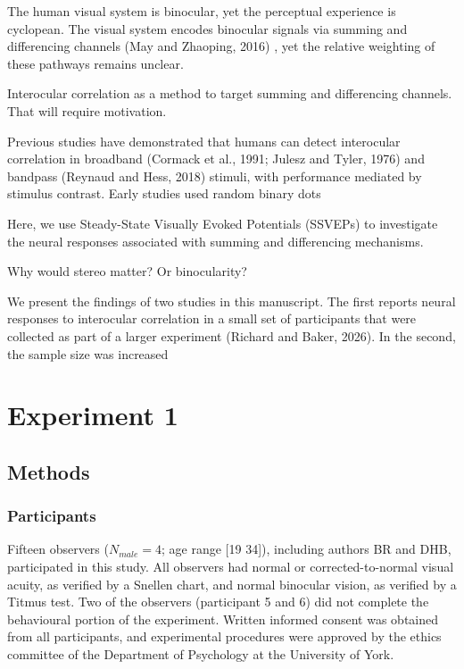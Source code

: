 \documentclass[
  12pt,
]{article}
\begin{document}
The human visual system is binocular, yet the perceptual experience is
cyclopean. The visual system encodes binocular signals via summing and
differencing channels (May and Zhaoping, 2016) , yet the relative
weighting of these pathways remains unclear.

Interocular correlation as a method to target summing and differencing
channels. That will require motivation.

Previous studies have demonstrated that humans can detect interocular
correlation in broadband (Cormack et al., 1991; Julesz and Tyler, 1976)
and bandpass (Reynaud and Hess, 2018) stimuli, with performance mediated
by stimulus contrast. Early studies used random binary dots

Here, we use Steady-State Visually Evoked Potentials (SSVEPs) to
investigate the neural responses associated with summing and
differencing mechanisms.

Why would stereo matter? Or binocularity?

We present the findings of two studies in this manuscript. The first
reports neural responses to interocular correlation in a small set of
participants that were collected as part of a larger experiment (Richard
and Baker, 2026). In the second, the sample size was increased

\section{Experiment 1}\label{experiment-1}

\subsection{Methods}\label{methods}

\subsubsection{Participants}\label{participants}

Fifteen observers (\(N_{male} = 4\); age range {[}19 34{]}), including
authors BR and DHB, participated in this study. All observers had normal
or corrected-to-normal visual acuity, as verified by a Snellen chart,
and normal binocular vision, as verified by a Titmus test. Two of the
observers (participant 5 and 6) did not complete the behavioural portion
of the experiment. Written informed consent was obtained from all
participants, and experimental procedures were approved by the ethics
committee of the Department of Psychology at the University of York.
\end{document}
